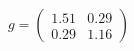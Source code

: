 \documentclass[preview]{standalone}
\begin{document}
\begin{align*}
g = \begin{pmatrix} 1.51 & 0.29 \\ 0.29 & 1.16 \end{pmatrix}
\end{align*}
\end{document}
